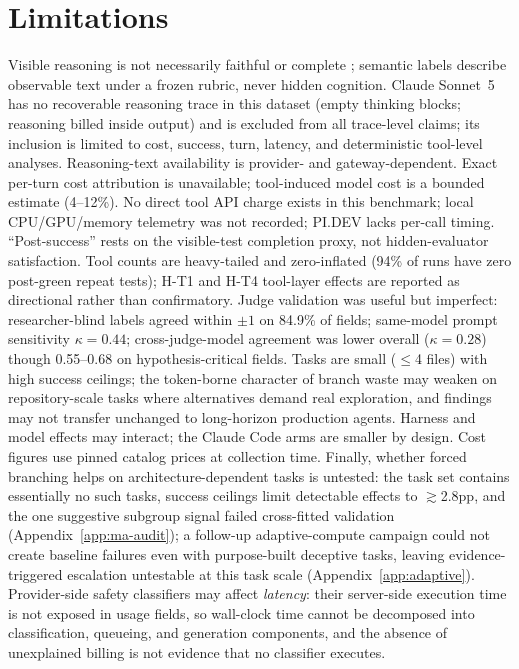 \documentclass[11pt]{article}
\newcommand{\pidev}{PI.DEV}
\newcommand{\citep}[1]{\cite{#1}}
\newcommand{\cc}{Claude Code}
\begin{document}
\section{Limitations}

Visible reasoning is not necessarily faithful or complete
\citep{baherwani2026}; semantic labels describe observable text under a
frozen rubric, never hidden cognition. Claude Sonnet~5 has no recoverable
reasoning trace in this dataset (empty thinking blocks; reasoning billed
inside output) and is excluded from all trace-level claims; its inclusion
is limited to cost, success, turn, latency, and deterministic tool-level
analyses. Reasoning-text availability is provider- and gateway-dependent.
Exact per-turn cost attribution is unavailable; tool-induced model cost
is a bounded estimate (4--12\%). No direct tool API charge exists in this
benchmark; local CPU/GPU/memory telemetry was not recorded; \pidev{}
lacks per-call timing. ``Post-success'' rests on the visible-test
completion proxy, not hidden-evaluator satisfaction. Tool counts are
heavy-tailed and zero-inflated (94\% of runs have zero post-green repeat
tests); H-T1 and H-T4 tool-layer effects are reported as directional rather
than confirmatory. Judge validation was useful but imperfect:
researcher-blind labels agreed within $\pm1$ on 84.9\% of fields;
same-model prompt sensitivity $\kappa=0.44$; cross-judge-model agreement
was lower overall ($\kappa=0.28$) though 0.55--0.68 on
hypothesis-critical fields. Tasks are small ($\leq$4 files) with high
success ceilings; the token-borne character of branch waste may weaken on
repository-scale tasks where alternatives demand real exploration, and
findings may not transfer unchanged to long-horizon production agents.
Harness and model effects may interact; the \cc{} arms are smaller by
design. Cost figures use pinned catalog prices at collection time. Finally, whether forced branching helps on
architecture-dependent tasks is untested: the task set contains
essentially no such tasks, success ceilings limit detectable effects to
$\gtrsim$2.8pp, and the one suggestive subgroup signal failed
cross-fitted validation (Appendix~\ref{app:ma-audit}); a follow-up
adaptive-compute campaign could not create baseline failures even with
purpose-built deceptive tasks, leaving evidence-triggered escalation untestable
at this task scale (Appendix~\ref{app:adaptive}).
Provider-side safety classifiers may affect \emph{latency}: their
server-side execution time is not exposed in usage fields, so wall-clock
time cannot be decomposed into classification, queueing, and generation
components, and the absence of unexplained billing is not evidence that
no classifier executes.
\end{document}

